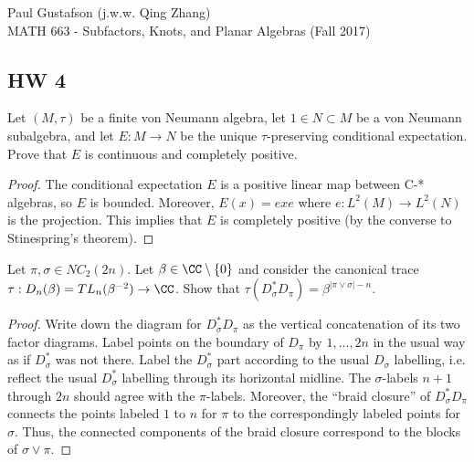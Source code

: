 \documentclass{article}
\begin{document}
\noindent Paul Gustafson (j.w.w. Qing Zhang) \\
\noindent MATH 663 - Subfactors, Knots, and Planar Algebras (Fall 2017)

\subsection*{HW 4}
 Let $(M, \tau)$ be a finite von Neumann algebra, let $1 \in N \subset M$ be a von Neumann subalgebra, and let $E: M \to N$ be the unique $\tau$-preserving conditional expectation.  Prove that $E$ is continuous and completely positive.

\begin{proof}
  The conditional expectation $E$ is a positive linear map between C-* algebras, so $E$ is bounded. Moreover, $E(x) = exe$ where $e:L^2(M) \to L^2(N)$ is the projection.  This implies that $E$ is completely positive (by the converse to Stinespring's theorem).
\end{proof}

 Let $\pi, \sigma \in NC_2(2n)$.  Let $\beta \in \CC \setminus \{0\}$ and consider the canonical trace $\tau : D_n(\beta) = TL_n(\beta^{-2}) \to \CC$.  Show that $\tau(D_\sigma^* D_\pi) = \beta^{|\pi \vee \sigma| - n}$.
\begin{proof}
  Write down the diagram for $D_\sigma^* D_\pi$ as the vertical concatenation of its two factor diagrams.  Label points on the boundary of $D_\pi$ by $1, \ldots, 2n$ in the usual way as if $D_\sigma^*$ was not there.  Label the $D_\sigma^*$ part according to the usual $D_\sigma$ labelling, i.e. reflect the usual $D_\sigma^*$ labelling through its horizontal midline. The $\sigma$-labels $n+1$ through $2n$ should agree with the $\pi$-labels. Moreover, the ``braid closure'' of $D_\sigma^* D_\pi$ connects the points labeled $1$ to $n$ for $\pi$ to the correspondingly labeled points for $\sigma$.  Thus, the connected components of the braid closure correspond to the blocks of $\sigma \vee \pi$. 
\end{proof}
\end{document}
